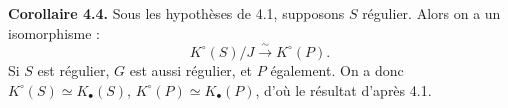 \textbf{Corollaire 4.4.} Sous les hypothèses de 4.1, supposons $S$ régulier. Alors on a un isomorphisme :
\[
K^\circ(S)/J\xrightarrow{\sim}K^\circ(P).
\]
Si $S$ est régulier, $G$ est aussi régulier, et $P$ également. On a donc $K^\circ(S)\simeq K_\bullet(S)$, $K^\circ(P)\simeq K_\bullet(P)$, d'où le résultat d'après 4.1.



\providecommand{\Filt}{\operatorname{Filt}}
\providecommand{\Coh}{\operatorname{Coh}}
\renewcommand{\Ob}{\operatorname{Ob}}
\providecommand{\longg}{\operatorname{long}}
\providecommand{\degtr}{\operatorname{deg.tr}}
\providecommand{\dimdot}{\operatorname{dim.}}
\providecommand{\Frac}{\operatorname{Frac}}
\providecommand{\fpqc}{\mathrm{fpqc}}
\providecommand{\Sch}{\operatorname{Sch}}
\providecommand{\Picf}{\operatorname{Pic}}
\providecommand{\Ens}{\operatorname{Ens}}
\providecommand{\im}{\operatorname{Im}}

